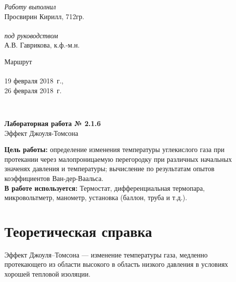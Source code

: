 \documentclass[a4paper,12pt]{article} %
\newcommand{\RomanNumeralCaps}[1]
{\MakeUppercase{\romannumeral #1}}
\begin{document}
	
	
\begin{minipage}[l]{0.3\textwidth}
	\textit{Работу выполнил}\\
	Просвирин Кирилл, 712гр.\\\\
	\textit{под руководством}\\
	А.В. Гаврикова, к.ф.-м.н.
\end{minipage}
\hfill
\begin{minipage}[l]{0.2\textwidth}
	Маршрут \RomanNumeralCaps{9} \\\\
	19 февраля 2018~г.,\\
	26 февраля 2018~г.\\
\end{minipage}
\\[20pt]
\begin{center}
	\LARGE{\textbf{Лабораторная работа № 2.1.6}\\
		Эффект Джоуля-Томсона \\[20pt]}
\end{center}

\textbf{Цель работы: }определение изменения температуры углекислого газа
при протекании через малопроницаемую перегородку при различных начальных
значенях давления и температуры; вычисление по результатам опытов
коэффициентов Ван-дер-Ваальса.\\

\textbf{В работе используется: }Термостат, дифференциальная термопара,
микровольтметр, манометр, установка (баллон, труба и т.д.).


\section{Теоретическая справка}

Эффект Джоуля–Томсона — изменение температуры газа, медленно протекающего
из области высокого в область низкого давления в условиях хорошей тепловой
изоляции.\\
\end{document}
